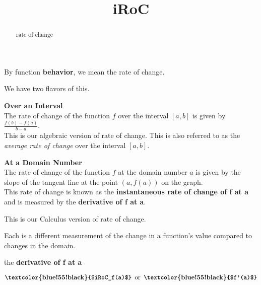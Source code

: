 \documentclass{ximera}
\title{iRoC}
\begin{document}
\begin{abstract}
rate of change
\end{abstract}
\maketitle




By function \textbf{behavior}, we mean the rate of change.


We have two flavors of this.




\begin{fact} \textbf{\textcolor{blue!55!black}{Over an Interval}}    \\


The rate of change of the function $f$ over the interval $[a, b]$ is given by $\frac{f(b) - f(a)}{b - a}$. \\


This is our algebraic version of rate of change. This is also referred to as the \textit{average rate of change} over the interval $[a, b]$.


\end{fact}






\begin{fact} \textbf{\textcolor{blue!55!black}{At a Domain Number}}   \\


The rate of change of the function $f$ at the domain number $a$ is given by the slope of the tangent line at the point $(a, f(a))$ on the graph. \\


This rate of change is known as the \textbf{\textcolor{purple!85!blue}{instantaneous rate of change of f at a}} and is measured by the \textbf{\textcolor{blue!55!black}{derivative of f at a}}. 


This is our Calculus version of rate of change.


\end{fact}


Each is a different measurement of the change in a function's value compared to changes in the domain. \\




\begin{notation} the \textbf{\textcolor{blue!55!black}{derivative of f at a}}


\[ \textbf{\textcolor{blue!55!black}{$iRoC_f(a)$}} \, \text{ or } \, \textbf{\textcolor{blue!55!black}{$f'(a)$}} \]

\end{notation}
\end{document}
